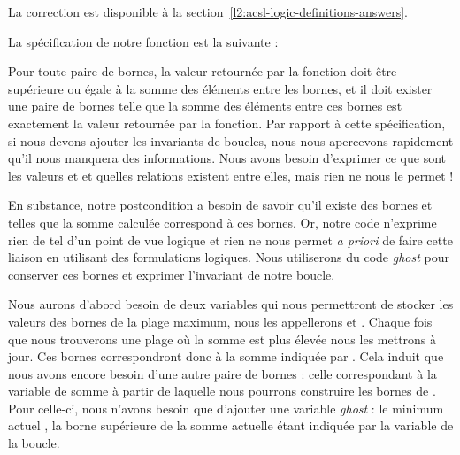 


La correction est disponible à la section~\ref{l2:acsl-logic-definitions-answers}.


La spécification de notre fonction est la suivante :






Pour toute paire de bornes, la valeur retournée par la fonction doit être
supérieure ou égale à la somme des éléments entre les bornes, et il doit exister
une paire de bornes telle que la somme des éléments entre ces bornes est
exactement la valeur retournée par la fonction. Par rapport à cette spécification,
si nous devons ajouter les invariants de boucles, nous nous apercevons rapidement
qu'il nous manquera des informations. Nous avons besoin d'exprimer ce que sont
les valeurs  et  et quelles relations existent entre elles,
mais rien ne nous le permet !



En substance, notre postcondition a besoin de savoir qu'il existe des
bornes  et  telles que la somme calculée correspond à ces bornes.
Or, notre code n'exprime rien de tel d'un point de vue logique et rien ne nous
permet \textit{a priori} de faire cette liaison en utilisant des formulations logiques.
Nous utiliserons du code \textit{ghost} pour conserver ces bornes et exprimer
l'invariant de notre boucle.



Nous aurons d'abord besoin de deux variables qui nous permettront de stocker
les valeurs des bornes de la plage maximum, nous les appellerons 
et . Chaque fois que nous trouverons une plage où la somme est plus
élevée nous les mettrons à jour. Ces bornes correspondront donc à la somme indiquée
par . Cela induit que nous avons encore besoin d'une autre paire de
bornes : celle correspondant à la variable de somme  à partir de laquelle
nous pourrons construire les bornes de . Pour celle-ci, nous n'avons
besoin que d'ajouter une variable \textit{ghost} : le minimum actuel , la
borne supérieure de la somme actuelle étant indiquée par la variable  de la
boucle.






